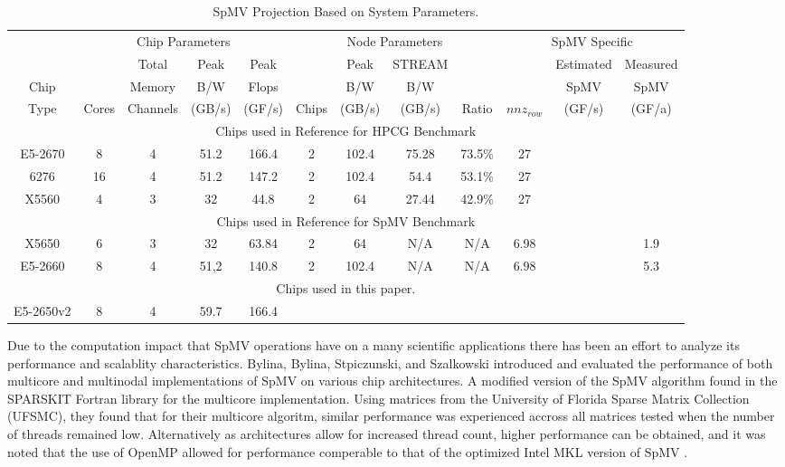 \begin{table}\begin{centering}
		\centering
		\begin{tabular}{|c|c|c|c|c|c|c|c|c|c|c|c|}
			\hline
			&\multicolumn{4}{|c|}{Chip Parameters}&\multicolumn{4}{|c|}{Node Parameters}&\multicolumn{3}{|c|}{SpMV Specific}\\
			\cline{2-11}
			&&Total&Peak&Peak&&Peak&STREAM&&&Estimated&Measured\\
			Chip&&Memory&B/W&Flops&&B/W&B/W&&&SpMV&SpMV\\
			Type&Cores&Channels&(GB/s)&(GF/s)&Chips&(GB/s)&(GB/s)&Ratio&$nnz_{row}$&(GF/s)&(GF/a)\\
			\hline\hline
			\multicolumn{12}{|c|}{Chips used in Reference %
				for HPCG Benchmark}\\ \hline
			E5-2670&8&4&51.2&166.4&2&102.4&75.28&73.5\%&27&&\\ \hline
			6276&16&4&51.2&147.2&2&102.4&54.4&53.1\%&27&&\\ \hline
			X5560&4&3&32&44.8&2&64&27.44&42.9\%&27&&\\ \hline
			
			\multicolumn{12}{|c|}{Chips used in Reference %
				for SpMV Benchmark}\\ \hline
			X5650&6&3&32&63.84&2&64&N/A&N/A&6.98&&1.9 \\ \hline
			E5-2660&8&4&51,2&140.8&2&102.4&N/A&N/A&6.98&&5.3 \\ \hline
			
			
			\multicolumn{12}{|c|}{Chips used in this paper.}\\ \hline
			E5-2650v2&8&4&59.7&166.4 \\ \hline
			\hline
		\end{tabular}
		\caption{SpMV Projection Based on System Parameters.}
		\label{tab:analytic}
\end{centering}\end{table}


Due to the computation impact that SpMV operations have on a many scientific applications there has been an effort to analyze its performance and scalablity characteristics. Bylina, Bylina, Stpiczunski, and Szalkowski \cite{techbib:6933066} introduced and evaluated the performance of both multicore and multinodal implementations of SpMV on various chip architectures. A modified version of the SpMV algorithm found in the SPARSKIT Fortran library \cite{saad1990sparskit} for the multicore implementation. Using matrices from the University of Florida Sparse Matrix Collection (UFSMC), they found that for their multicore algoritm, similar performance was experienced accross all matrices tested when the number of threads remained low. Alternatively as architectures allow for increased thread count, higher performance can be obtained, and it was noted that the use of OpenMP allowed for performance comperable to that of the optimized Intel MKL version of SpMV .

